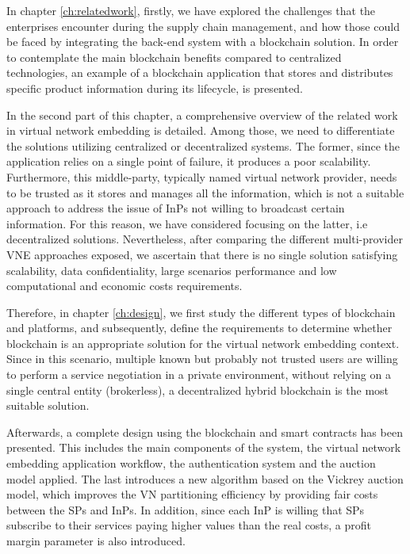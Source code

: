 In chapter \ref{ch:relatedwork}, firstly, we have explored the challenges that the enterprises encounter during the supply chain management, and how those could be faced by integrating the back-end system with a blockchain solution. In order to contemplate the main blockchain benefits compared to centralized technologies, an example of a blockchain application that stores and distributes specific product information during its lifecycle, is presented.

In the second part of this chapter, a comprehensive overview of the related work in virtual network embedding is detailed. Among those, we need to differentiate the solutions utilizing centralized or decentralized systems. The former, since the application relies on a single point of failure, it produces a poor scalability. Furthermore, this middle-party, typically named virtual network provider, needs to be trusted as it stores and manages all the information, which is not a suitable approach to address the issue of InPs not willing to broadcast certain information. For this reason, we have considered focusing on the latter, i.e decentralized solutions. Nevertheless, after comparing the different multi-provider VNE approaches exposed, we ascertain that there is no single solution satisfying scalability, data confidentiality, large scenarios performance and low computational and economic costs requirements.

Therefore, in chapter \ref{ch:design}, we first study the different types of blockchain and platforms, and subsequently, define the requirements to determine whether blockchain is an appropriate solution for the virtual network embedding context. Since in this scenario, multiple known but probably not trusted users are willing to perform a service negotiation in a private environment, without relying on a single central entity (brokerless), a decentralized hybrid blockchain is the most suitable solution.

Afterwards, a complete design using the blockchain and smart contracts has been presented. This includes the main components of the system, the virtual network embedding application workflow, the authentication system and the auction model applied. The last introduces a new algorithm based on the Vickrey auction model, which improves the VN partitioning efficiency by providing fair costs between the SPs and InPs. In addition, since each InP is willing that SPs subscribe to their services paying higher values than the real costs, a profit margin parameter is also introduced.

